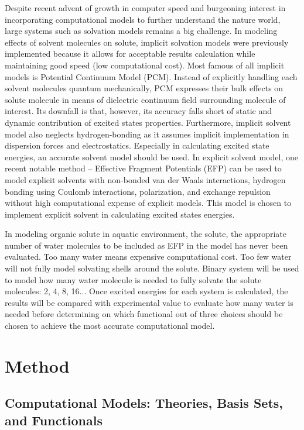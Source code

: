 \documentclass[
journal=jpcbfk, %
manuscript=article]{achemso}
\begin{document}
Despite recent advent of growth in computer speed and burgeoning interest in incorporating computational models to further understand the nature world, large systems such as solvation models remains a big challenge.\cite{Lin2007} In modeling effects of solvent molecules on solute, implicit solvation models were previously implemented because it allows for acceptable results calculation while maintaining good speed (low computational cost). Most famous of all implicit models is Potential Continuum Model (PCM).\cite{Cossi2000} Instead of explicitly handling each solvent molecules quantum mechanically, PCM expresses their bulk effects on solute molecule in means of dielectric continuum field surrounding molecule of interest. Its downfall is that, however, its accuracy falls short of static and dynamic contribution of excited states properties.\cite{Barone2007} Furthermore, implicit solvent model also neglects hydrogen-bonding as it assumes implicit implementation in dispersion forces and electrostatics.\cite{Li1999} Especially in calculating excited state energies, an accurate solvent model should be used.\cite{Tomasi2005} In explicit solvent model, one recent notable method – Effective Fragment Potentials (EFP) can be used to model explicit solvents with non-bonded van der Waals interactions, hydrogen bonding using Coulomb interactions, polarization, and exchange repulsion without high computational expense of explicit models.\cite{Day1996,Yoo2008} This model is chosen to implement explicit solvent in calculating excited states energies.

In modeling organic solute in aquatic environment, the solute, the appropriate number of water molecules to be included as EFP in the model has never been evaluated. Too many water means expensive computational cost. Too few water will not fully model solvating shells around the solute. Binary system will be used to model how many water molecule is needed to fully solvate the solute molecules: 2, 4, 8, 16... Once excited energies for each system is calculated, the results will be compared with experimental value to evaluate how many water is needed before determining on which functional out of three choices should be chosen to achieve the most accurate computational model. 


\section{Method}

\subsection{Computational Models: Theories, Basis Sets, and Functionals}
\end{document}
